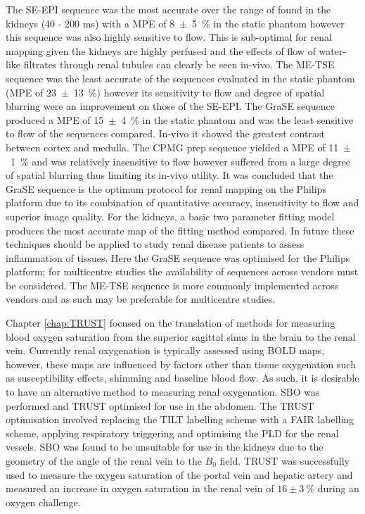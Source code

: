 The \ac{SE}-\ac{EPI} sequence was the most accurate over the range of \ttwo found in the kidneys (40 - 200 ms) with a \ac{MPE} of 8~$\pm$~5~\% in the static phantom however this sequence was also highly sensitive to flow. This is sub-optimal for renal \ttwo mapping given the kidneys are highly perfused and the effects of flow of water-like filtrates through renal tubules can clearly be seen in-vivo. The \ac{ME-TSE} sequence was the least accurate of the sequences evaluated in the static phantom (\ac{MPE} of 23~$\pm$~13~\%) however its sensitivity to flow and degree of spatial blurring were an improvement on those of the \ac{SE}-\ac{EPI}. The \ac{GraSE} sequence produced a \ac{MPE} of 15~$\pm$~4~\% in the static phantom and was the least sensitive to flow of the sequences compared. In-vivo it showed the greatest contrast between cortex and medulla. The \ac{CPMG} \ttwo prep sequence yielded a \ac{MPE} of 11~$\pm$~1~\% and was relatively insensitive to flow however suffered from a large degree of spatial blurring thus limiting its in-vivo utility. It was concluded that the \ac{GraSE} sequence is the optimum protocol for renal \ttwo mapping on the Philips platform due to its combination of quantitative accuracy, insensitivity to flow and superior image quality. For the kidneys, a basic two parameter fitting model produces the most accurate \ttwo map of the fitting method compared. In future these techniques should be applied to study renal disease patients to assess inflammation of tissues. Here the \ac{GraSE} sequence was optimised for the Philips platform; for multicentre studies the availability of sequences across vendors must be considered. The \ac{ME-TSE} sequence is more commonly implemented across vendors and as such may be preferable for multicentre studies.

Chapter \ref{chap:TRUST} focused on the translation of methods for measuring blood oxygen saturation from the superior sagittal sinus in the brain to the renal vein. Currently renal oxygenation is typically assessed using \ac{BOLD} \ttwostar maps, however, these maps are influenced by factors other than tissue oxygenation such as susceptibility effects, shimming and baseline blood flow. As such, it is desirable to have an alternative method to measuring renal oxygenation. \ac{SBO} was performed and \ac{TRUST} optimised for use in the abdomen. The \ac{TRUST} optimisation involved replacing the \ac{TILT} labelling scheme with a \ac{FAIR} labelling scheme, applying respiratory triggering and optimising the \ac{PLD} for the renal vessels. \ac{SBO} was found to be unsuitable for use in the kidneys due to the geometry of the angle of the renal vein to the $B_0$ field. \ac{TRUST} was successfully used to measure the oxygen saturation of the portal vein and hepatic artery and measured an increase in oxygen saturation in the renal vein of $16 \pm 3~\%$ during an oxygen challenge.

